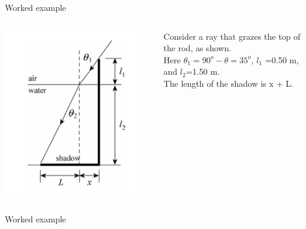 {\begin{frame}{Worked example}
\begin{columns}
  \begin{column}{0.25\textwidth}
   \begin{center}
     \includegraphics[width=0.95\textwidth]{./images/problems/lect8_pole_shadow_solution.png}
   \end{center}
  \end{column}
  \begin{column}{0.75\textwidth}
     Consider a ray that grazes the top of the rod, as shown.\\
     \vspace{0.2cm}
     Here $\theta_1 = 90^{o}-\theta= 35^{o}$, $l_1$ =0.50 m, and $l_2$=1.50 m.\\
     \vspace{0.2cm}
    The length of the shadow is x + L.\\
  \end{column}
\end{columns}

\end{frame}

%
%
%

\begin{frame}{Worked example}


\end{frame}}
